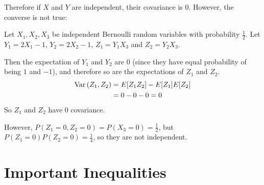 \documentclass[../Main.tex]{subfiles}
\begin{document}
Therefore if $X$ and $Y$ are independent, their covariance is 0. However, the converse is not true:
\begin{example}
    Let $X_1, X_2, X_3$ be independent Bernoulli random variables with probability $\frac{1}{2}$. Let $Y_1 = 2X_1 - 1$, $Y_2 = 2X_2 - 1$, $Z_1 = Y_1 X_3$ and $Z_2 = Y_2 X_3$.\par
    Then the expectation of $Y_1$ and $Y_2$ are 0 (since they have equal probability of being $1$ and $-1$), and therefore so are the expectations of $Z_1$ and $Z_2$.
    \begin{align*}
        \operatorname{Var}{(Z_1, Z_2)} &= E[Z_1 Z_2] - E[Z_1] E[Z_2] \\
        &= 0 - 0 - 0 = 0
    \end{align*}
    So $Z_1$ and $Z_2$ have 0 covariance.\par
    However, $P(Z_1 = 0, Z_2 = 0) = P(X_3 = 0) = \frac{1}{2}$, but $P(Z_1 = 0)P(Z_2 = 0) = \frac{1}{4}$, so they are not independent.
\end{example}
\section{Important Inequalities}
\end{document}
